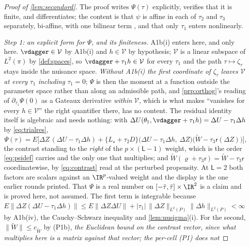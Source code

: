 \begin{proof}[Proof of \cref{lem:secondord}]
The proof writes $\Psi(\tau)$ explicitly, verifies that it is finite, and differentiates; the content is
that $\psi$ is affine in each of $\tau_2$ and $\tau_3$ separately, bi-affine, with one bilinear term
, and that only $\tau_1$ enters nonlinearly.

\emph{Step 1: an explicit form for $\Psi$, and its finiteness.}
A1b(i) enters here, and only here. $\vdagger\in\mathcal V$ by A1b(i) and $h\in\mathcal V$ by
hypothesis; $\mathcal V$ is a linear subspace of $L^{2}(\pi)$ by \cref{def:spaces}, so
$\vdagger+\tau_1h\in\mathcal V$ for every $\tau_1$ and the path $\tau\mapsto\zeta_\tau$ stays inside the
nuisance space. \emph{Without A1b(i) the first coordinate of $\zeta_\tau$ leaves $\mathcal V$ at every
$\tau_1$ including $\tau_1=0$}; $\Psi$ is then the moment at a function outside the parameter space
rather than along an admissible path, and \cref{prp:orthog}'s reading of $\partial_{\tau_1}\Psi(0)$ as a
Gateaux derivative \emph{within} $\mathcal V$, which is what makes ``vanishes for every
$h\in\mathcal V$'' the right quantifier there, has no content. The residual identity itself is
algebraic and needs nothing: with $\Delta U(\theta_\dagger,\vdagger+\tau_1h)=\Delta U-\tau_1\Delta h$ by
\eqref{eq:trialres},
\begin{equation}\label{eq:Psitau}
\Psi(\tau)=E\Big[\Delta Z\,(\Delta U-\tau_1\Delta h)
+\big\{L_\star+\tau_2D\big\}\big(\Delta U-\tau_1\Delta h,\ \Delta Z\big)\big(\widetilde W-\tau_3\mathsf r(\Delta Z)\big)\Big],
\end{equation}
the contrast standing to the \emph{right} of the $p\times(\mathsf L-1)$ weight, which is the order
\eqref{eq:psidef} carries and the only one that multiplies; and
$\widetilde W(\varrho+\tau_3\mathsf r)=\widetilde W-\tau_3\mathsf r$ coordinatewise, by
\eqref{eq:contrast} read at the perturbed propensity. At $\mathsf L=2$ both factors are scalars
against an $\IR^{p}$-valued weight and the display is the one earlier rounds printed.
That $\Psi$ is a real number on $[-\bar\tau,\bar\tau]\times\IR^{2}$ is a claim and is proved here,
not assumed. The first term is integrable because
$E\|\Delta Z(\Delta U-\tau_1\Delta h)\|\le E\|\Delta Z\Delta U\|+|\tau_1|\,\|\Delta Z\|_{L^{2}(P)}\|\Delta h\|_{L^{2}(P)}<\infty$
by A1b(iv), the Cauchy--Schwarz inequality and \cref{lem:nusigma}(i). For the second,
$\|\widetilde W\|\le c_{\widetilde W}$ by \textup{(P1b)}, \emph{the Euclidean bound on the contrast
vector, since what multiplies here is a matrix against that vector; the per-cell \textup{(P1)} does not
}
\end{proof}
